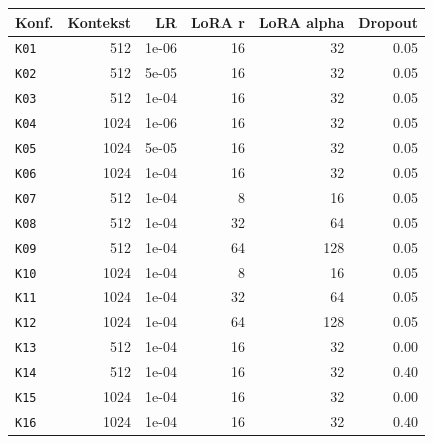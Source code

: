 \begin{tabular}{lrrrrr}
\hline
\textbf{Konf.} & \textbf{Kontekst} & \textbf{LR} & \textbf{LoRA r} & \textbf{LoRA alpha} & \textbf{Dropout} \\
\hline
\texttt{K01} & 512 & 1e-06 & 16 & 32 & 0.05 \\
\texttt{K02} & 512 & 5e-05 & 16 & 32 & 0.05 \\
\texttt{K03} & 512 & 1e-04 & 16 & 32 & 0.05 \\
\texttt{K04} & 1024 & 1e-06 & 16 & 32 & 0.05 \\
\texttt{K05} & 1024 & 5e-05 & 16 & 32 & 0.05 \\
\texttt{K06} & 1024 & 1e-04 & 16 & 32 & 0.05 \\
\texttt{K07} & 512 & 1e-04 & 8 & 16 & 0.05 \\
\texttt{K08} & 512 & 1e-04 & 32 & 64 & 0.05 \\
\texttt{K09} & 512 & 1e-04 & 64 & 128 & 0.05 \\
\texttt{K10} & 1024 & 1e-04 & 8 & 16 & 0.05 \\
\texttt{K11} & 1024 & 1e-04 & 32 & 64 & 0.05 \\
\texttt{K12} & 1024 & 1e-04 & 64 & 128 & 0.05 \\
\texttt{K13} & 512 & 1e-04 & 16 & 32 & 0.00 \\
\texttt{K14} & 512 & 1e-04 & 16 & 32 & 0.40 \\
\texttt{K15} & 1024 & 1e-04 & 16 & 32 & 0.00 \\
\texttt{K16} & 1024 & 1e-04 & 16 & 32 & 0.40 \\
\hline
\end{tabular}
